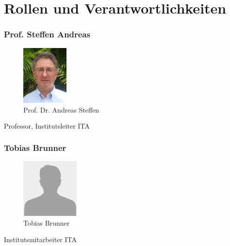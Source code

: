 \section{Rollen und Verantwortlichkeiten}

\subsubsection{Prof. Steffen Andreas}
\noindent\begin{minipage}{0.5\textwidth}
\begin{figure}[H]
	\centering
	\includegraphics[height=30mm]{images/asteffen.jpg}
	\caption{Prof. Dr. Andreas Steffen}
\end{figure}
\end{minipage}
\hfill
\begin{minipage}{0.5\textwidth}
Professor, Institutsleiter ITA \\
\end{minipage}


\subsubsection{Tobias Brunner}
\noindent\begin{minipage}{0.5\textwidth}
\begin{figure}[H]
	\centering
	\includegraphics[height=30mm]{images/unknown.png}
	\caption{Tobias Brunner}
\end{figure}
\end{minipage}
\hfill
\begin{minipage}{0.5\textwidth}
Institutsmitarbeiter ITA \\
\end{minipage}


